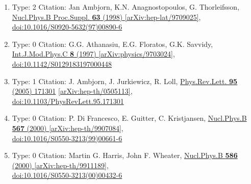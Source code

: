 \documentclass[a4paper,10pt]{article}
\begin{document}
\begin{enumerate}
\begin{enumerate}
  \item Type: 2 Citation: Jan Ambjorn, K.N. Anagnostopoulos, G. Thorleifsson, \href{https://www.doi.org/10.1016/S0920-5632(97)00890-6}{Nucl.Phys.B Proc.Suppl. {\bf 63} (1998) }  \href{https://arxiv.org/abs/hep-lat/9709025}{[arXiv:hep-lat/9709025]},\\\href{https://www.doi.org/10.1016/S0920-5632(97)00890-6}{doi:10.1016/S0920-5632(97)00890-6}
  \item Type: 0 Citation: G.G. Athanasiu, E.G. Floratos, G.K. Savvidy, \href{https://www.doi.org/10.1142/S0129183197000448}{Int.J.Mod.Phys.C {\bf 8} (1997) }  \href{https://arxiv.org/abs/physics/9703024}{[arXiv:physics/9703024]},\\\href{https://www.doi.org/10.1142/S0129183197000448}{doi:10.1142/S0129183197000448}
  \item Type: 1 Citation: J. Ambjorn, J. Jurkiewicz, R. Loll, \href{https://www.doi.org/10.1103/PhysRevLett.95.171301}{Phys.Rev.Lett. {\bf 95} (2005) 171301}  \href{https://arxiv.org/abs/hep-th/0505113}{[arXiv:hep-th/0505113]},\\\href{https://www.doi.org/10.1103/PhysRevLett.95.171301}{doi:10.1103/PhysRevLett.95.171301}
  \item Type: 0 Citation: P. Di Francesco, E. Guitter, C. Kristjansen, \href{https://www.doi.org/10.1016/S0550-3213(99)00661-6}{Nucl.Phys.B {\bf 567} (2000) }  \href{https://arxiv.org/abs/hep-th/9907084}{[arXiv:hep-th/9907084]},\\\href{https://www.doi.org/10.1016/S0550-3213(99)00661-6}{doi:10.1016/S0550-3213(99)00661-6}
  \item Type: 0 Citation: Martin G. Harris, John F. Wheater, \href{https://www.doi.org/10.1016/S0550-3213(00)00432-6}{Nucl.Phys.B {\bf 586} (2000) }  \href{https://arxiv.org/abs/hep-th/9911189}{[arXiv:hep-th/9911189]},\\\href{https://www.doi.org/10.1016/S0550-3213(00)00432-6}{doi:10.1016/S0550-3213(00)00432-6}

\end{enumerate}
\end{enumerate}
\end{document}
